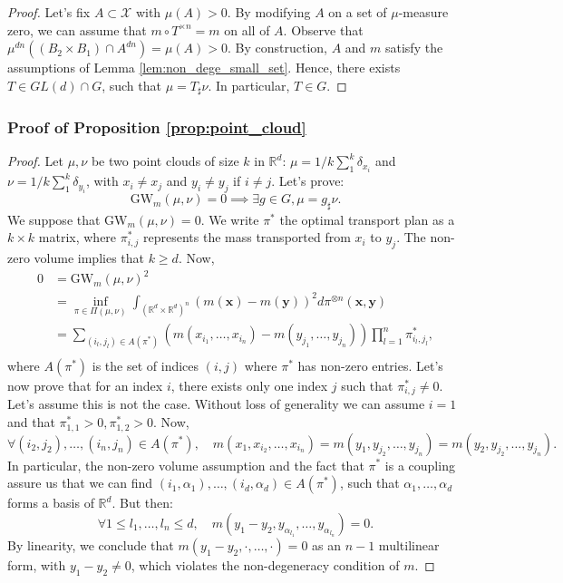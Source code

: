 \documentclass{article}
\newcommand{\R}{\mathbb{R}}
\newcommand{\X}{\mathcal{X}}
\newcommand{\1}{\mathbf{1}}
\newcommand{\GW}{\mathrm{GW}}
\theoremstyle{definition}
\theoremstyle{remark}
\begin{document}
\begin{appendices}
\begin{proof}
    Let's fix $A\subset\X$ with $\mu(A)>0$. By modifying $A$ on a set of $\mu$-measure zero, we can assume that $m\circ T^{\times n}=m$ on all of $A$. Observe that $\mu^{dn}((B_2\times B_1)\cap  A^{dn})=\mu(A)>0$.
    By construction, $A$ and $m$ satisfy the assumptions of Lemma \ref{lem:non_dege_small_set}. Hence, there exists $T\in GL(d)\cap G$, such that $\mu = T_\sharp \nu$. In particular, $T\in G$.
\end{proof}

\subsubsection*{Proof of Proposition \ref{prop:point_cloud}}
\begin{proof}
    Let $\mu,\nu$ be two point clouds of size $k$ in $\R^d$: $\mu=1/k\sum_1^k \delta_{x_i}$ and $ \nu=1/k\sum_1^k \delta_{y_i}$, with $x_i\neq x_j$ and $y_i\neq y_j$ if $i\neq j$. Let's prove: \[  \GW_{m}(\mu,\nu)= 0 \implies \exists g\in G, \mu = g_\sharp\nu.\]
    We suppose that $\GW_{m}(\mu,\nu)= 0$. We write $\pi^*$ the optimal transport plan as a $k\times k $ matrix, where $\pi^*_{i,j}$ represents the mass transported from $x_i$ to $y_j$. The non-zero volume implies that $k\geq d$. Now,
    \begin{equation}\label{eq:GW_0_point_cloud}
        \begin{split}
             0&=\GW_{m}(\mu,\nu)^2\\
             &=\inf_{\pi\in\Pi(\mu,\nu)}\int_{(\R^d\times\R^d)^n}(m(\mathbf{x})-m(\mathbf{y}))^2d\pi^{\otimes n}(\mathbf{x},\mathbf{y}) \\
             &= \sum_{(i_l,j_l)\in A(\pi^*)} (m(x_{i_1},\dots,x_{i_n})-m(y_{j_1},\dots,y_{j_n})) \prod_{l=1}^n\pi^*_{i_l,j_l},\\
        \end{split}
    \end{equation}
    where $A(\pi^*)$ is the set of indices $(i,j)$ where $\pi^*$ has non-zero entries. Let's now prove that for an index $i$, there exists only one index $j$ such that  $\pi^*_{i,j}\neq0$. Let's assume this is not the case. Without loss of generality  we can assume $i=1$ and that $\pi^*_{1,1}>0,\pi^*_{1,2}>0$. Now, \[\forall (i_2,j_2),\dots,(i_n,j_n)\in A(\pi^*),\quad m(x_1,x_{i_2},\dots,x_{i_n})=m(y_1,y_{j_2},\dots,y_{j_n})=m(y_2,y_{j_2},\dots,y_{j_n}).\] In particular, the non-zero volume assumption and the fact that $\pi^*$ is a coupling assure us that we can find $(i_1,\alpha_1),\dots, (i_d,\alpha_d)\in A(\pi^*)$, such that $\alpha_1,\dots,\alpha_d$ forms a basis of $\R^d$. But then:
    \[\forall 1\leq l_1, \dots,l_n\leq d,\quad m(y_1-y_2,y_{\alpha_{l_1}},\dots,y_{\alpha_{l_n}}) =0.\]
    By linearity, we conclude that $m(y_1-y_2, \cdot,\dots,\cdot)=0$ as an $n-1$ multilinear form, with $y_1-y_2\neq0$, which violates the non-degeneracy condition of $m$.


\end{proof}
\end{appendices}
\end{document}

